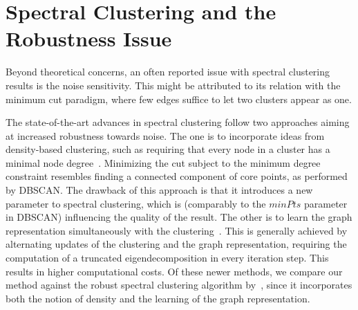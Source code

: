 \section{Spectral Clustering and the Robustness Issue}
Beyond theoretical concerns, an often reported issue with spectral clustering results is the noise sensitivity. This might be attributed to its relation with the minimum cut paradigm, where few edges suffice to let two clusters appear as one.   

The state-of-the-art advances in spectral clustering follow two approaches aiming at increased robustness towards noise. The one is to incorporate ideas from density-based clustering, such as requiring that every node in a cluster has a minimal node degree~\citep{bojchevski2017robust}. Minimizing the cut subject to the minimum degree constraint resembles finding a connected component of core points, as performed by DBSCAN. The drawback of this approach is that it introduces a new parameter to spectral clustering, which is (comparably to the $minPts$ parameter in DBSCAN) influencing the quality of the result.  
The other is to learn the graph representation simultaneously with the clustering~\citep{bojchevski2017robust,kang2018unified,nie2017learning}. This is generally achieved by alternating updates of the clustering and the graph representation, requiring the computation of a truncated eigendecomposition in every iteration step. This results in higher computational costs.
Of these newer methods, we compare our method against the robust spectral clustering algorithm by~\cite{bojchevski2017robust}, since it incorporates both the notion of density and the learning of the graph representation.

